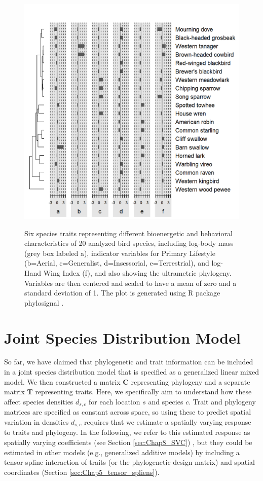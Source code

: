 \begin{figure}[!ht]
    \caption[Traits used for joint species distribution model]{Six species traits representing different bioenergetic and behavioral characteristics of 20 analyzed bird species, including log-body mass (grey box labeled a), indicator variables for Primary Lifestyle (b=Aerial, c=Generalist, d=Insessorial, e=Terrestrial), and log-Hand Wing Index (f), and also showing the ultrametric phylogeny.  Variables are then centered and scaled to have a mean of zero and a standard deviation of 1.  The plot is generated using R package \colorbox{backcolour}{phylosignal} \cite{keck_phylosignal_2016}.}
    \includegraphics[width=5.5in]{Chap_11/Phylogeny_and_traits.png}
    \label{fig:Chap11_phylogeny_and_traits}
\end{figure}

\section{Joint Species Distribution Model}

So far, we have claimed that phylogenetic and trait information can be included in a joint species distribution model that is specified as a generalized linear mixed model.  We then constructed a matrix \(\mathbf{C}\) representing phylogeny and a separate matrix \(\mathbf{T}\) representing traits.  Here, we specifically aim to understand how these affect species densities \(d_{s,c}\) for each location \(s\) and species \(c\).  Trait and phylogeny matrices are specified as constant across space, so using these to predict spatial variation in densities \(d_{s,c}\) requires that we estimate a spatially varying response to traits and phylogeny.  In the following, we refer to this estimated response as spatially varying coefficients (see Section \ref{sec:Chap8_SVC}) \cite{thorson_spatially_2023}, but they could be estimated in other models (e.g., generalized additive models) by including a tensor spline interaction of traits (or the phylogenetic design matrix) and spatial coordinates (Section \ref{sec:Chap5_tensor_spliens}).  

